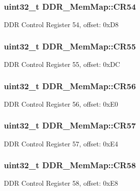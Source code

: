 \subsubsection[{C\+R54}]{\setlength{\rightskip}{0pt plus 5cm}uint32\+\_\+t D\+D\+R\+\_\+\+Mem\+Map\+::\+C\+R54}\label{struct_d_d_r___mem_map_a0b6344d64165c3f2360510501654e1da}
D\+D\+R Control Register 54, offset\+: 0x\+D8 \hypertarget{struct_d_d_r___mem_map_a26953eae58da71780cda45c1027fc274}{}
\subsubsection[{C\+R55}]{\setlength{\rightskip}{0pt plus 5cm}uint32\+\_\+t D\+D\+R\+\_\+\+Mem\+Map\+::\+C\+R55}\label{struct_d_d_r___mem_map_a26953eae58da71780cda45c1027fc274}
D\+D\+R Control Register 55, offset\+: 0x\+D\+C \hypertarget{struct_d_d_r___mem_map_af2fe2ea08209a795d32fd13e580fc0b8}{}
\subsubsection[{C\+R56}]{\setlength{\rightskip}{0pt plus 5cm}uint32\+\_\+t D\+D\+R\+\_\+\+Mem\+Map\+::\+C\+R56}\label{struct_d_d_r___mem_map_af2fe2ea08209a795d32fd13e580fc0b8}
D\+D\+R Control Register 56, offset\+: 0x\+E0 \hypertarget{struct_d_d_r___mem_map_a570d957a418225583181a432b9aed5f9}{}
\subsubsection[{C\+R57}]{\setlength{\rightskip}{0pt plus 5cm}uint32\+\_\+t D\+D\+R\+\_\+\+Mem\+Map\+::\+C\+R57}\label{struct_d_d_r___mem_map_a570d957a418225583181a432b9aed5f9}
D\+D\+R Control Register 57, offset\+: 0x\+E4 \hypertarget{struct_d_d_r___mem_map_a88ed266cdaa2d15139e5c836b3ffa220}{}
\subsubsection[{C\+R58}]{\setlength{\rightskip}{0pt plus 5cm}uint32\+\_\+t D\+D\+R\+\_\+\+Mem\+Map\+::\+C\+R58}\label{struct_d_d_r___mem_map_a88ed266cdaa2d15139e5c836b3ffa220}
D\+D\+R Control Register 58, offset\+: 0x\+E8 \hypertarget{struct_d_d_r___mem_map_a5514954901a16a381f9845054781d61e}{}
